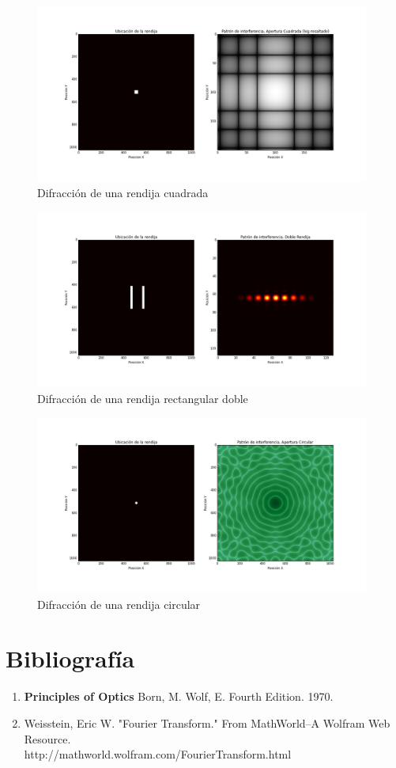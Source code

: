 \documentclass{article}
\begin{document}
\begin{figure}[H]
\centering
\includegraphics[width=0.98\textwidth]{Cuadrado.png}
\caption{Difracción de una rendija cuadrada} \label{fig:cuadrado}
\end{figure}
\begin{figure}[H]
\centering
\includegraphics[width=0.98\textwidth]{DosRect.png}
\caption{Difracción de una rendija rectangular doble} \label{fig:rectangulo}
\end{figure}
\begin{figure}[H]
\centering
\includegraphics[width=0.98\textwidth]{Circulo.png}
\caption{Difracción de una rendija circular} \label{fig:circulo}
\end{figure}
\section{Bibliografía}
\begin{enumerate}
\item \textbf{Principles of Optics} Born, M. Wolf, E. Fourth Edition. 1970. 
\item  Weisstein, Eric W. "Fourier Transform." From MathWorld--A Wolfram Web Resource.\\ http://mathworld.wolfram.com/FourierTransform.html 
\end{enumerate}
\end{document}
